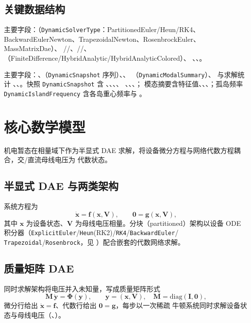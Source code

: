 \documentclass[UTF8,fontset=fandol,a4paper,11pt]{ctexart}
\begin{document}
\subsection{关键数据结构}
主要字段：（\texttt{DynamicSolverType}：PartitionedEuler/Heun/RK4、
BackwardEulerNewton、TrapezoidalNewton、RosenbrockEuler、MassMatrixDae）、
//、//、
（FiniteDifference/\allowbreak HybridAnalytic/\allowbreak HybridAnalyticColored）、
、、。

主要字段：、（\texttt{DynamicSnapshot} 序列）、、
（\texttt{DynamicModalSummary}）、 与求解统计
、、。快照
\texttt{DynamicSnapshot} 含 、、、、
、、、；
模态摘要含特征值、、、；孤岛频率
\texttt{DynamicIslandFrequency} 含各岛重心频率与 。

\section{核心数学模型}
机电暂态在相量域下作为半显式 DAE 求解，将设备微分方程与网络代数方程耦合，交/直流母线电压为
代数状态。

\subsection{半显式 DAE 与两类架构}
系统方程为
\begin{equation}
\dot{\mathbf{x}} = \mathbf{f}(\mathbf{x},\mathbf{V}),\qquad
\mathbf{0} = \mathbf{g}(\mathbf{x},\mathbf{V}),
\end{equation}
其中 $\mathbf{x}$ 为设备状态、$\mathbf{V}$ 为母线电压相量。分块（partitioned）架构以设备 ODE
积分器（\texttt{ExplicitEuler}/\texttt{Heun}(RK2)/\texttt{RK4}/\texttt{BackwardEuler}/
\texttt{Trapezoidal}/\texttt{Rosenbrock}，见 ）配合嵌套的代数网络求解。

\subsection{质量矩阵 DAE}
同时求解架构将电压并入未知量，写成质量矩阵形式
\begin{equation}
\mathbf{M}\,\dot{\mathbf{y}} = \boldsymbol{\Phi}(\mathbf{y}),\qquad
\mathbf{y}=(\mathbf{x},\mathbf{V}),\quad \mathbf{M}=\mathrm{diag}(\mathbf{I},\mathbf{0}),
\end{equation}
微分行给出 $\dot{\mathbf{x}}=\mathbf{f}$、代数行给出 $\mathbf{0}=\mathbf{g}$，每步以一次稀疏
牛顿系统同时求解设备状态与母线电压（、）。
\end{document}
